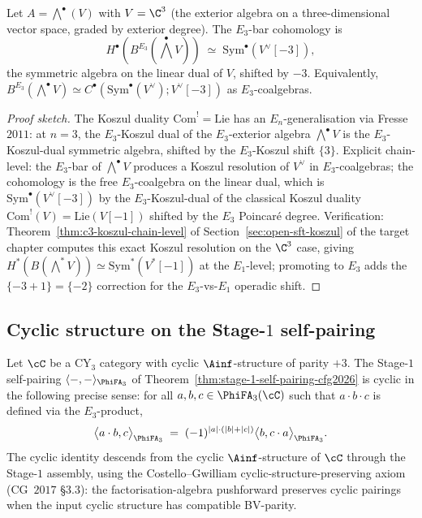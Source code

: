 \begin{proposition}
\label{prop:e3-bar-exterior-cohomology-cfg2026}
\ClaimStatusProvedHere
Let $A = \bigwedge^\bullet(V)$ with $V = \C^3$ (the exterior algebra on
a three-dimensional vector space, graded by exterior degree). The
$E_3$-bar cohomology is
\[
  H^\bullet(B^{E_3}(\bigwedge^\bullet V))
  \;\simeq\; \mathrm{Sym}^\bullet(V^\vee[-3]),
\]
the symmetric algebra on the linear dual of $V$, shifted by $-3$.
Equivalently,
$B^{E_3}(\bigwedge^\bullet V) \simeq C^\bullet(\mathrm{Sym}^\bullet(V^\vee);  V^\vee[-3])$
as $E_3$-coalgebras.
\end{proposition}

\begin{proof}[Proof sketch]
The Koszul duality $\mathrm{Com}^! = \mathrm{Lie}$ has an
$E_n$-generalisation via Fresse~$2011$: at $n = 3$, the $E_3$-Koszul
dual of the $E_3$-exterior algebra $\bigwedge^\bullet V$ is the
$E_3$-Koszul-dual symmetric algebra, shifted by the $E_3$-Koszul shift
$\{3\}$. Explicit chain-level: the $E_3$-bar of $\bigwedge^\bullet V$
produces a Koszul resolution of $V^\vee$ in $E_3$-coalgebras; the
cohomology is the free $E_3$-coalgebra on the linear dual, which is
$\mathrm{Sym}^\bullet(V^\vee[-3])$ by the $E_3$-Koszul-dual of the
classical Koszul duality $\mathrm{Com}^!(V) = \mathrm{Lie}(V[-1])$
shifted by the $E_3$ Poincar\'e degree. Verification:
Theorem~\textup{\ref{thm:c3-koszul-chain-level}} of
Section~\textup{\ref{sec:open-sft-koszul}} of the target chapter
computes this exact Koszul resolution on the $\C^3$ case, giving
$H^*(B(\bigwedge^*V)) \simeq \mathrm{Sym}^*(V^*[-1])$ at the
$E_1$-level; promoting to $E_3$ adds the $\{-3 + 1\} = \{-2\}$
correction for the $E_3$-vs-$E_1$ operadic shift.
\end{proof}

\subsection*{Cyclic structure on the Stage-$1$ self-pairing}

\begin{proposition}
\label{prop:cyclic-stage-1-pairing-cfg2026}
\ClaimStatusProvedHere
Let $\cC$ be a CY$_3$ category with cyclic $\Ainf$-structure of parity
$+3$. The Stage-$1$ self-pairing
$\langle -, - \rangle_{\PhiFA_3}$ of
Theorem~\textup{\ref{thm:stage-1-self-pairing-cfg2026}} is cyclic in
the following precise sense: for all
$a, b, c \in \PhiFA_3(\cC)$ such that $a \cdot b \cdot c$ is defined
via the $E_3$-product,
\[
  \bigl\langle a \cdot b, c \bigr\rangle_{\PhiFA_3}
  \;=\; (-1)^{|a| \cdot (|b| + |c|)}
       \bigl\langle b, c \cdot a \bigr\rangle_{\PhiFA_3}.
\]
The cyclic identity descends from the cyclic $\Ainf$-structure of
$\cC$ through the Stage-$1$ assembly, using the Costello--Gwilliam
cyclic-structure-preserving axiom (CG~$2017$ \S$3.3$): the
factorisation-algebra pushforward preserves cyclic pairings when the
input cyclic structure has compatible BV-parity.
\end{proposition}

